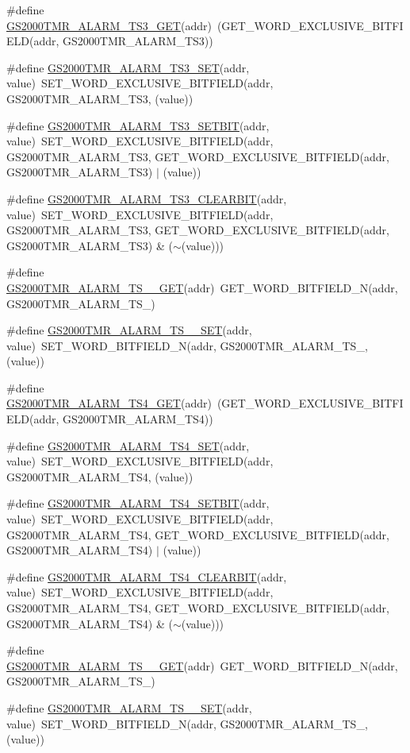 \begin{DoxyCompactItemize}
\item 
\#define \hyperlink{a00555_a6433b53cd9fac54493d790121d9b4e15}{GS2000TMR\_\-ALARM\_\-TS3\_\-GET}(addr)~(GET\_\-WORD\_\-EXCLUSIVE\_\-BITFIELD(addr, GS2000TMR\_\-ALARM\_\-TS3))
\item 
\#define \hyperlink{a00555_a783b74a9d45e8cdeca11befd8ed668f4}{GS2000TMR\_\-ALARM\_\-TS3\_\-SET}(addr, value)~SET\_\-WORD\_\-EXCLUSIVE\_\-BITFIELD(addr, GS2000TMR\_\-ALARM\_\-TS3, (value))
\item 
\#define \hyperlink{a00555_aac0f987317f20588f1fa1650c2acd8d8}{GS2000TMR\_\-ALARM\_\-TS3\_\-SETBIT}(addr, value)~SET\_\-WORD\_\-EXCLUSIVE\_\-BITFIELD(addr, GS2000TMR\_\-ALARM\_\-TS3, GET\_\-WORD\_\-EXCLUSIVE\_\-BITFIELD(addr, GS2000TMR\_\-ALARM\_\-TS3) $|$ (value))
\item 
\#define \hyperlink{a00555_a6289047b4760c5e908fbf8eb43086b1a}{GS2000TMR\_\-ALARM\_\-TS3\_\-CLEARBIT}(addr, value)~SET\_\-WORD\_\-EXCLUSIVE\_\-BITFIELD(addr, GS2000TMR\_\-ALARM\_\-TS3, GET\_\-WORD\_\-EXCLUSIVE\_\-BITFIELD(addr, GS2000TMR\_\-ALARM\_\-TS3) \& ($\sim$(value)))
\item 
\#define \hyperlink{a00555_a471ee25308c0c08e28db0701f72598f0}{GS2000TMR\_\-ALARM\_\-TS\_\_\-GET}(addr)~GET\_\-WORD\_\-BITFIELD\_\-N(addr, GS2000TMR\_\-ALARM\_\-TS\_)
\item 
\#define \hyperlink{a00555_a85c80dbad9c3051123314791dfa4353d}{GS2000TMR\_\-ALARM\_\-TS\_\_\-SET}(addr, value)~SET\_\-WORD\_\-BITFIELD\_\-N(addr, GS2000TMR\_\-ALARM\_\-TS\_, (value))
\item 
\#define \hyperlink{a00555_a78a84ff1c6fbe7b892f20fe217b5bbee}{GS2000TMR\_\-ALARM\_\-TS4\_\-GET}(addr)~(GET\_\-WORD\_\-EXCLUSIVE\_\-BITFIELD(addr, GS2000TMR\_\-ALARM\_\-TS4))
\item 
\#define \hyperlink{a00555_a48561ea3c57b6c641dcfc5aa65ed3675}{GS2000TMR\_\-ALARM\_\-TS4\_\-SET}(addr, value)~SET\_\-WORD\_\-EXCLUSIVE\_\-BITFIELD(addr, GS2000TMR\_\-ALARM\_\-TS4, (value))
\item 
\#define \hyperlink{a00555_ab11541f8aa5b2299dead34c4853fbd16}{GS2000TMR\_\-ALARM\_\-TS4\_\-SETBIT}(addr, value)~SET\_\-WORD\_\-EXCLUSIVE\_\-BITFIELD(addr, GS2000TMR\_\-ALARM\_\-TS4, GET\_\-WORD\_\-EXCLUSIVE\_\-BITFIELD(addr, GS2000TMR\_\-ALARM\_\-TS4) $|$ (value))
\item 
\#define \hyperlink{a00555_aa623e61eab6ee3d553a7c6ca18eafe10}{GS2000TMR\_\-ALARM\_\-TS4\_\-CLEARBIT}(addr, value)~SET\_\-WORD\_\-EXCLUSIVE\_\-BITFIELD(addr, GS2000TMR\_\-ALARM\_\-TS4, GET\_\-WORD\_\-EXCLUSIVE\_\-BITFIELD(addr, GS2000TMR\_\-ALARM\_\-TS4) \& ($\sim$(value)))
\item 
\#define \hyperlink{a00555_a5f2d42e4dab6a54bf52041e33e264fc4}{GS2000TMR\_\-ALARM\_\-TS\_\_\-GET}(addr)~GET\_\-WORD\_\-BITFIELD\_\-N(addr, GS2000TMR\_\-ALARM\_\-TS\_)
\item 
\#define \hyperlink{a00555_a092ee2040eb39bd1fcf93e1280788908}{GS2000TMR\_\-ALARM\_\-TS\_\_\-SET}(addr, value)~SET\_\-WORD\_\-BITFIELD\_\-N(addr, GS2000TMR\_\-ALARM\_\-TS\_, (value))
\end{DoxyCompactItemize}


